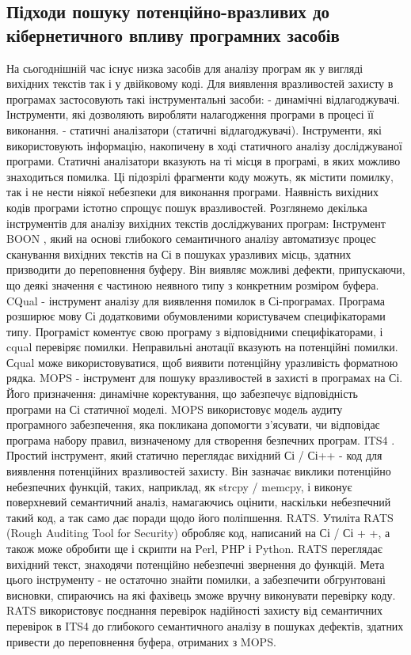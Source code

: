 \documentclass[oneside,final,14pt]{extreport}
\begin{document}
\subsection{Підходи пошуку потенційно-вразливих до кібернетичного впливу програмних засобів}
\label{1section:id3}
На сьогоднішній час існує низка засобів для аналізу програм як у вигляді вихідних текстів так і у двійковому коді.
Для виявлення вразливостей захисту в програмах застосовують такі інструментальні засоби:
-   динамічні відлагоджувачі. Інструменти, які дозволяють виробляти налагодження програми в процесі її виконання.
-   статичні аналізатори (статичні відлагоджувачі). Інструменти, які використовують інформацію, накопичену в ході статичного аналізу досліджуваної програми.
Статичні аналізатори вказують на ті місця в програмі, в яких можливо знаходиться помилка. Ці підозрілі фрагменти коду можуть, як містити помилку, так і не нести ніякої небезпеки для виконання програми. Наявність вихідних кодів програми істотно спрощує пошук вразливостей.
Розглянемо декілька інструментів для аналізу вихідних текстів досліджуваних програм:
Інструмент BOON , який на основі глибокого семантичного аналізу автоматизує процес сканування вихідних текстів на Сі в пошуках уразливих місць, здатних призводити до переповнення буферу. Він виявляє можливі дефекти, припускаючи, що деякі значення є частиною неявного типу з конкретним розміром буфера.
CQual - інструмент аналізу для виявлення помилок в Сі-програмах. Програма розширює мову Сі додатковими обумовленими користувачем специфікаторами типу. Програміст коментує свою програму з відповідними специфікаторами, і cqual перевіряє помилки. Неправильні анотації вказують на потенційні помилки. Сqual може використовуватися, щоб виявити потенційну уразливість форматною рядка.
MOPS - інструмент для пошуку вразливостей в захисті в програмах на Сі. Його призначення: динамічне коректування, що забезпечує відповідність програми на Сі статичної моделі. MOPS використовує модель аудиту програмного забезпечення, яка покликана допомогти з'ясувати, чи відповідає програма набору правил, визначеному для створення безпечних програм.
ITS4 . Простий інструмент, який статично переглядає вихідний Сі / Сі++ - код для виявлення потенційних вразливостей захисту. Він зазначає виклики потенційно небезпечних функцій, таких, наприклад, як strcpy / memcpy, і виконує поверхневий семантичний аналіз, намагаючись оцінити, наскільки небезпечний такий код, а так само дає поради щодо його поліпшення.
RATS. Утиліта RATS (Rough Auditing Tool for Security) обробляє код, написаний на Сі / Сі + +, а також може обробити ще і скрипти на Perl, PHP і Python. RATS переглядає вихідний текст, знаходячи потенційно небезпечні звернення до функцій. Мета цього інструменту - не остаточно знайти помилки, а забезпечити обгрунтовані висновки, спираючись на які фахівець зможе вручну виконувати перевірку коду. RATS використовує поєднання перевірок надійності захисту від семантичних перевірок в ITS4 до глибокого семантичного аналізу в пошуках дефектів, здатних привести до переповнення буфера, отриманих з MOPS.
\end{document}
